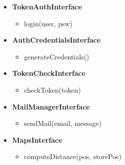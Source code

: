 \begin{itemize}
	\clearpage

	\item \textbf{TokenAuthInterface}
	\begin{itemize}
		\item login(user, psw)
	\end{itemize}

	\item \textbf{AuthCredentialsInterface}
	\begin{itemize}
		\item generateCredentials()
	\end{itemize}

	\item \textbf{TokenCheckInterface}
	\begin{itemize}
		\item checkToken(token)
	\end{itemize}

	\item \textbf{MailManagerInterface}
	\begin{itemize}
		\item sendMail(email, message)
	\end{itemize}

	\item \textbf{MapsInterface}
	\begin{itemize}
		\item computeDistance(pos, storePos)
	\end{itemize}


\end{itemize}
